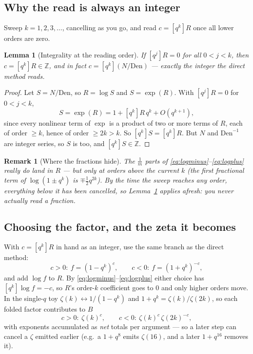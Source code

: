 \documentclass[11pt]{article}
\newtheorem{lemma}[theorem]{Lemma}
\newtheorem{remark}[theorem]{Remark}
\begin{document}
\subsection{Why the read is always an integer}

Sweep $k=1,2,3,\dots$, cancelling as you go, and read $c=[q^k]R$ once all lower
orders are zero.

\begin{lemma}[Integrality at the reading order]
\label{lem:integer}
If $[q^j]R=0$ for all $0<j<k$, then $c=[q^k]R\in\mathbb{Z}$, and in fact
$c=[q^k](N/\mathrm{Den})$ --- exactly the integer the direct method reads.
\end{lemma}

\begin{proof}
Let $S=N/\mathrm{Den}$, so $R=\log S$ and $S=\exp(R)$. With $[q^j]R=0$ for $0<j<k$,
\[
S=\exp(R)=1+[q^k]R\,q^k+O(q^{k+1}),
\]
since every nonlinear term of $\exp$ is a product of two or more terms of $R$, each
of order $\ge k$, hence of order $\ge 2k>k$. So $[q^k]S=[q^k]R$. But $N$ and
$\mathrm{Den}^{-1}$ are integer series, so $S$ is too, and $[q^k]S\in\mathbb{Z}$.
\end{proof}

\begin{remark}[Where the fractions hide]
The $\tfrac1m$ parts of \eqref{eq:logminus}--\eqref{eq:logplus} really do land in
$R$ --- but only at orders \emph{above} the current $k$ (the first fractional term
of $\log(1\pm q^k)$ is $\mp\tfrac12 q^{2k}$). By the time the sweep reaches any
order, everything below it has been cancelled, so Lemma~\ref{lem:integer} applies
afresh: you never actually read a fraction.
\end{remark}

\subsection{Choosing the factor, and the zeta it becomes}

With $c=[q^k]R$ in hand as an integer, use the same branch as the direct method:
\[
c>0:\ f=(1-q^k)^{c},\qquad c<0:\ f=(1+q^k)^{-c},
\]
and add $\log f$ to $R$. By \eqref{eq:logminus}--\eqref{eq:logplus} either choice has
$[q^k]\log f=-c$, so $R$'s order-$k$ coefficient goes to $0$ and only higher orders
move. In the single-$q$ toy $\zeta(k)\leftrightarrow 1/(1-q^k)$ and
$1+q^k=\zeta(k)/\zeta(2k)$, so each folded factor contributes to $B$
\[
c>0:\ \zeta(k)^{c}, \qquad c<0:\ \zeta(k)^{c}\,\zeta(2k)^{-c},
\]
with exponents accumulated as \emph{net} totals per argument --- so a later step can
cancel a $\zeta$ emitted earlier (e.g.\ a $1+q^8$ emits $\zeta(16)$, and a later
$1+q^{16}$ removes it).
\end{document}
